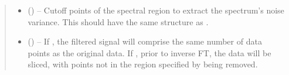 \documentclass[letterpaper,10pt,english]{sphinxmanual}
\begin{document}
\begin{fulllineitems}
\begin{fulllineitems}
\begin{quote}
\begin{description}
\begin{itemize}
\item {} 
\sphinxAtStartPar
{} (\sphinxstyleliteralemphasis{\sphinxupquote{{[}}}\sphinxstyleliteralemphasis{\sphinxupquote{{[}}}\sphinxstyleliteralemphasis{\sphinxupquote{, }}\sphinxstyleliteralemphasis{\sphinxupquote{{]}}}\sphinxstyleliteralemphasis{\sphinxupquote{{]}}}\sphinxstyleliteralemphasis{\sphinxupquote{, }}\sphinxstyleliteralemphasis{\sphinxupquote{{[}}}\sphinxstyleliteralemphasis{\sphinxupquote{{[}}}\sphinxstyleliteralemphasis{\sphinxupquote{, }}\sphinxstyleliteralemphasis{\sphinxupquote{{]}}}\sphinxstyleliteralemphasis{\sphinxupquote{, }}\sphinxstyleliteralemphasis{\sphinxupquote{{[}}}\sphinxstyleliteralemphasis{\sphinxupquote{, }}\sphinxstyleliteralemphasis{\sphinxupquote{{]}}}\sphinxstyleliteralemphasis{\sphinxupquote{{]}}}\sphinxstyleliteralemphasis{\sphinxupquote{,        }}\sphinxstyleliteralemphasis{\sphinxupquote{{[}}}\sphinxstyleliteralemphasis{\sphinxupquote{{[}}}\sphinxstyleliteralemphasis{\sphinxupquote{, }}\sphinxstyleliteralemphasis{\sphinxupquote{{]}}}\sphinxstyleliteralemphasis{\sphinxupquote{{]} or }}\sphinxstyleliteralemphasis{\sphinxupquote{{[}}}\sphinxstyleliteralemphasis{\sphinxupquote{{[}}}\sphinxstyleliteralemphasis{\sphinxupquote{, }}\sphinxstyleliteralemphasis{\sphinxupquote{{]}}}\sphinxstyleliteralemphasis{\sphinxupquote{, }}\sphinxstyleliteralemphasis{\sphinxupquote{{[}}}\sphinxstyleliteralemphasis{\sphinxupquote{, }}\sphinxstyleliteralemphasis{\sphinxupquote{{]}}}\sphinxstyleliteralemphasis{\sphinxupquote{{]}}}) – Cut\sphinxhyphen{}off points of the spectral region to extract the spectrum’s
noise variance. This should have the same structure as .

\item {} 
\sphinxAtStartPar
{} (\sphinxstyleliteralemphasis{\sphinxupquote{, }}) – If , the filtered signal will comprise the same number of
data points as the original data. If , prior to inverse
FT, the data will be sliced, with points not in the region
specified by  being removed.


\end{itemize}
\end{description}
\end{quote}
\end{fulllineitems}
\end{fulllineitems}
\end{document}
